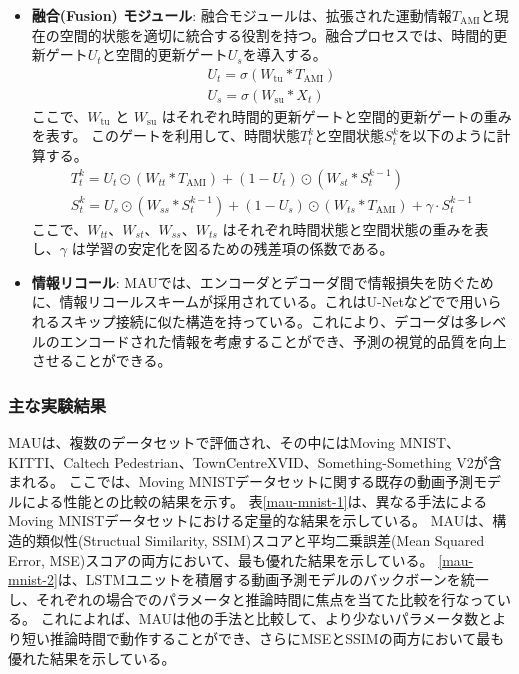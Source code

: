 \begin{itemize}
        \item \textbf{融合(Fusion) モジュール}: 融合モジュールは、拡張された運動情報\(T_{\text{AMI}} \)と現在の空間的状態を適切に統合する役割を持つ。融合プロセスでは、時間的更新ゲート\( U_t \)と空間的更新ゲート\( U_s \)を導入する。
        \begin{align}
          U_t = \sigma(W_{\text{tu}} \ast T_{\text{AMI}}) \\
          U_s = \sigma(W_{\text{su}} \ast X_t) 
        \end{align}
        ここで、\( W_{\text{tu}} \) と \( W_{\text{su}} \) はそれぞれ時間的更新ゲートと空間的更新ゲートの重みを表す。
        このゲートを利用して、時間状態\( T_{t}^{k} \)と空間状態\( S_{t}^{k} \)を以下のように計算する。
        \begin{align}
        T_{t}^{k} = U_t \odot (W_{tt} \ast T_{\text{AMI}}) + (1 - U_t) \odot (W_{st} \ast S_{t}^{k-1}) \\
        S_{t}^{k} = U_s \odot (W_{ss} \ast S_{t}^{k-1}) + (1 - U_s) \odot (W_{ts} \ast T_{\text{AMI}}) + \gamma \cdot S_{t}^{k-1}
        \end{align}
        ここで、\( W_{tt} \)、\( W_{st} \)、\( W_{ss} \)、\( W_{ts} \) はそれぞれ時間状態と空間状態の重みを表し、\( \gamma \) は学習の安定化を図るための残差項の係数である。

        \item \textbf{情報リコール}: 
          MAUでは、エンコーダとデコーダ間で情報損失を防ぐために、情報リコールスキームが採用されている。これはU-Netなどでで用いられるスキップ接続に似た構造を持っている。これにより、デコーダは多レベルのエンコードされた情報を考慮することができ、予測の視覚的品質を向上させることができる。    

       \end{itemize}

      \subsubsection{主な実験結果}
        MAUは、複数のデータセットで評価され、その中にはMoving MNIST、KITTI、Caltech Pedestrian、TownCentreXVID、Something-Something V2が含まれる。
        ここでは、Moving MNISTデータセットに関する既存の動画予測モデルによる性能との比較の結果を示す。
        表\ref{mau-mnist-1}は、異なる手法によるMoving MNISTデータセットにおける定量的な結果を示している。
        MAUは、構造的類似性(Structual Similarity, SSIM)スコアと平均二乗誤差(Mean Squared Error, MSE)スコアの両方において、最も優れた結果を示している。
        \ref{mau-mnist-2}は、LSTMユニットを積層する動画予測モデルのバックボーンを統一し、それぞれの場合でのパラメータと推論時間に焦点を当てた比較を行なっている。
        これによれば、MAUは他の手法と比較して、より少ないパラメータ数とより短い推論時間で動作することができ、さらにMSEとSSIMの両方において最も優れた結果を示している。

